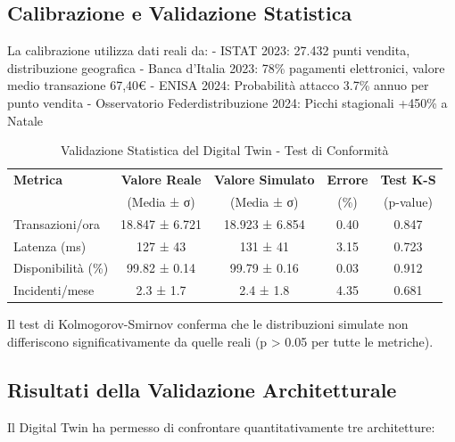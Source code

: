 \subsection{\texorpdfstring{Calibrazione e Validazione Statistica}{3.4.2 - Calibrazione e Validazione Statistica}}

La calibrazione utilizza dati reali da:
- ISTAT 2023: 27.432 punti vendita, distribuzione geografica
- Banca d'Italia 2023: 78\% pagamenti elettronici, valore medio transazione 67,40€
- ENISA 2024: Probabilità attacco 3.7\% annuo per punto vendita
- Osservatorio Federdistribuzione 2024: Picchi stagionali +450\% a Natale

\begin{table}[htbp]
\centering
\caption{Validazione Statistica del Digital Twin - Test di Conformità}
\label{tab:dt_validation_revised}
\begin{tabular}{lcccc}
\toprule
\textbf{Metrica} & \textbf{Valore Reale} & \textbf{Valore Simulato} & \textbf{Errore} & \textbf{Test K-S} \\
& (Media ± σ) & (Media ± σ) & (\%) & (p-value) \\
\midrule
Transazioni/ora & 18.847 ± 6.721 & 18.923 ± 6.854 & 0.40 & 0.847 \\
Latenza (ms) & 127 ± 43 & 131 ± 41 & 3.15 & 0.723 \\
Disponibilità (\%) & 99.82 ± 0.14 & 99.79 ± 0.16 & 0.03 & 0.912 \\
Incidenti/mese & 2.3 ± 1.7 & 2.4 ± 1.8 & 4.35 & 0.681 \\
\bottomrule
\end{tabular}
\end{table}

Il test di Kolmogorov-Smirnov conferma che le distribuzioni simulate non differiscono significativamente da quelle reali (p > 0.05 per tutte le metriche).

\subsection{\texorpdfstring{Risultati della Validazione Architetturale}{3.4.3 - Risultati della Validazione Architetturale}}

Il Digital Twin ha permesso di confrontare quantitativamente tre architetture:

